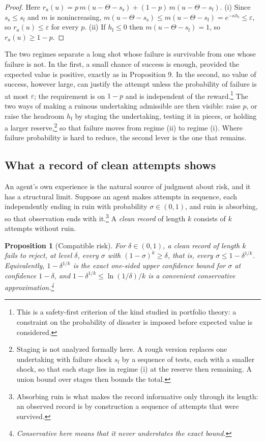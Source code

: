 \documentclass[11pt]{article}
\newtheorem{proposition}{Proposition}
\theoremstyle{remark}
\begin{document}
\begin{proof}
Here $r_a(u)=p\,m(u-\Theta-s_{\mathrm s})+(1-p)\,m(u-\Theta-s_{\mathrm f})$. (i) Since $s_{\mathrm s}\le s_{\mathrm f}$ and $m$ is nonincreasing, $m(u-\Theta-s_{\mathrm s})\le m(u-\Theta-s_{\mathrm f})=e^{-\kappa h_{\mathrm f}}\le\varepsilon$, so $r_a(u)\le\varepsilon$ for every $p$. (ii) If $h_{\mathrm f}\le0$ then $m(u-\Theta-s_{\mathrm f})=1$, so $r_a(u)\ge1-p$.
\end{proof}

The two regimes separate a long shot whose failure is survivable from one whose failure is not. In the first, a small chance of success is enough, provided the expected value is positive, exactly as in Proposition 9. In the second, no value of success, however large, can justify the attempt unless the probability of failure is at most $\varepsilon$; the requirement is on $1-p$ and is independent of the reward.\footnote{This is a safety-first criterion of the kind studied in portfolio theory: a constraint on the probability of disaster is imposed before expected value is considered.} The two ways of making a ruinous undertaking admissible are then visible: raise $p$, or raise the headroom $h_{\mathrm f}$ by staging the undertaking, testing it in pieces, or holding a larger reserve,\footnote{Staging is not analyzed formally here. A rough version replaces one undertaking with failure shock $s_{\mathrm f}$ by a sequence of tests, each with a smaller shock, so that each stage lies in regime (i) at the reserve then remaining. A union bound over stages then bounds the total.} so that failure moves from regime (ii) to regime (i). Where failure probability is hard to reduce, the second lever is the one that remains.

\subsection{What a record of clean attempts shows}

An agent's own experience is the natural source of judgment about risk, and it has a structural limit. Suppose an agent makes attempts in sequence, each independently ending in ruin with probability $\sigma\in(0,1)$, and ruin is absorbing, so that observation ends with it.\footnote{Absorbing ruin is what makes the record informative only through its length: an observed record is by construction a sequence of attempts that were survived.} A \emph{clean record} of length $k$ consists of $k$ attempts without ruin.

\begin{proposition}[Compatible risk]
For $\delta\in(0,1)$, a clean record of length $k$ fails to reject, at level $\delta$, every $\sigma$ with $(1-\sigma)^k\ge\delta$, that is, every $\sigma\le1-\delta^{1/k}$. Equivalently, $1-\delta^{1/k}$ is the exact one-sided upper confidence bound for $\sigma$ at confidence $1-\delta$, and $1-\delta^{1/k}\le\ln(1/\delta)/k$ is a convenient conservative approximation.\footnote{Conservative here means that it never understates the exact bound.}
\end{proposition}
\end{document}

